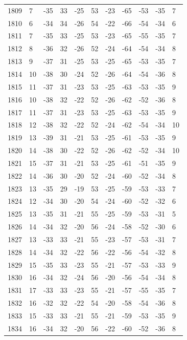 \begin{table}[H]
\begin{tabular}{lllllllllll}
1809 & 7 & -35 & 33 & -25 & 53 & -23 & -65 & -53 & -35 & 7 \\
1810 & 6 & -34 & 34 & -26 & 54 & -22 & -66 & -54 & -34 & 6 \\
1811 & 7 & -35 & 33 & -25 & 53 & -23 & -65 & -55 & -35 & 7 \\
1812 & 8 & -36 & 32 & -26 & 52 & -24 & -64 & -54 & -34 & 8 \\
1813 & 9 & -37 & 31 & -25 & 53 & -25 & -65 & -53 & -35 & 7 \\
1814 & 10 & -38 & 30 & -24 & 52 & -26 & -64 & -54 & -36 & 8 \\
1815 & 11 & -37 & 31 & -23 & 53 & -25 & -63 & -53 & -35 & 9 \\
1816 & 10 & -38 & 32 & -22 & 52 & -26 & -62 & -52 & -36 & 8 \\
1817 & 11 & -37 & 31 & -23 & 53 & -25 & -63 & -53 & -35 & 9 \\
1818 & 12 & -38 & 32 & -22 & 52 & -24 & -62 & -54 & -34 & 10 \\
1819 & 13 & -39 & 31 & -21 & 53 & -25 & -61 & -53 & -35 & 9 \\
1820 & 14 & -38 & 30 & -22 & 52 & -26 & -62 & -52 & -34 & 10 \\
1821 & 15 & -37 & 31 & -21 & 53 & -25 & -61 & -51 & -35 & 9 \\
1822 & 14 & -36 & 30 & -20 & 52 & -24 & -60 & -52 & -34 & 8 \\
1823 & 13 & -35 & 29 & -19 & 53 & -25 & -59 & -53 & -33 & 7 \\
1824 & 12 & -34 & 30 & -20 & 54 & -24 & -60 & -52 & -32 & 6 \\
1825 & 13 & -35 & 31 & -21 & 55 & -25 & -59 & -53 & -31 & 5 \\
1826 & 14 & -34 & 32 & -20 & 56 & -24 & -58 & -52 & -30 & 6 \\
1827 & 13 & -33 & 33 & -21 & 55 & -23 & -57 & -53 & -31 & 7 \\
1828 & 14 & -34 & 32 & -22 & 56 & -22 & -56 & -54 & -32 & 8 \\
1829 & 15 & -35 & 33 & -23 & 55 & -21 & -57 & -53 & -33 & 9 \\
1830 & 16 & -34 & 32 & -24 & 56 & -20 & -56 & -54 & -34 & 8 \\
1831 & 17 & -33 & 33 & -23 & 55 & -21 & -57 & -55 & -35 & 7 \\
1832 & 16 & -32 & 32 & -22 & 54 & -20 & -58 & -54 & -36 & 8 \\
1833 & 15 & -33 & 33 & -21 & 55 & -21 & -59 & -53 & -35 & 9 \\
1834 & 16 & -34 & 32 & -20 & 56 & -22 & -60 & -52 & -36 & 8 \\

\end{tabular}
\end{table}
